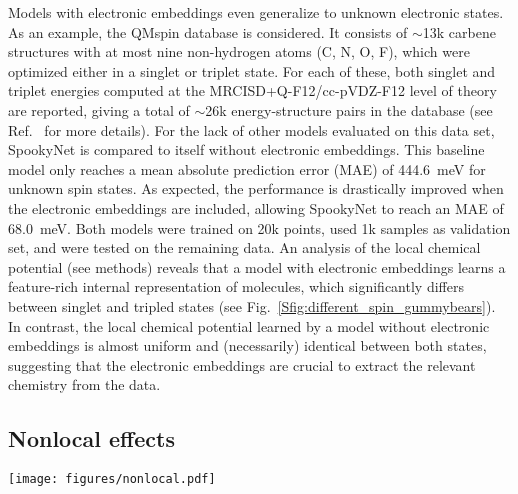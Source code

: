 \documentclass[%
superscriptaddress,
reprint,
nofootinbib,
amsmath,amssymb,amsfonts,
floatfix,
altaffilletter,
showkeys,
]{revtex4-2}
\newcommand{\nn}{SpookyNet}
\begin{document}
Models with electronic embeddings even generalize to unknown electronic states. As an example, the QMspin database\cite{qmspin} is considered. It consists of $\sim$13k carbene structures with at most nine non-hydrogen atoms (C, N, O, F), which were optimized either in a singlet or triplet state. For each of these, both singlet and triplet energies computed at the MRCISD+Q-F12/cc-pVDZ-F12 level of theory are reported, giving a total of $\sim$26k energy-structure pairs in the database (see Ref.~ for more details). For the lack of other models evaluated on this data set, \nn{} is compared to itself without electronic embeddings. This baseline model only reaches a mean absolute prediction error (MAE) of 444.6~meV for unknown spin states. As expected, the performance is drastically improved when the electronic embeddings are included, allowing \nn{} to reach an MAE of 68.0~meV. Both models were trained on 20k points, used 1k samples as validation set, and were tested on the remaining data.
An analysis of the local chemical potential (see methods) reveals that a model with electronic embeddings learns a feature-rich internal representation of molecules, which significantly differs between singlet and tripled states (see Fig.~\ref{Sfig:different_spin_gummybears}). In contrast, the local chemical potential learned by a model without electronic embeddings is almost uniform and (necessarily) identical between both states, suggesting that the electronic embeddings are crucial to extract the relevant chemistry from the data.






\subsection*{Nonlocal effects}
\label{sec:nonlocal_effects}
\begin{figure*}
	\texttt{[image: figures/nonlocal.pdf]}
	\caption{Dissociation curves of different diatomic molecules predicted by \nn{} with/without nonlocal interactions.}
	\label{fig:nonlocal}
\end{figure*}
\end{document}
